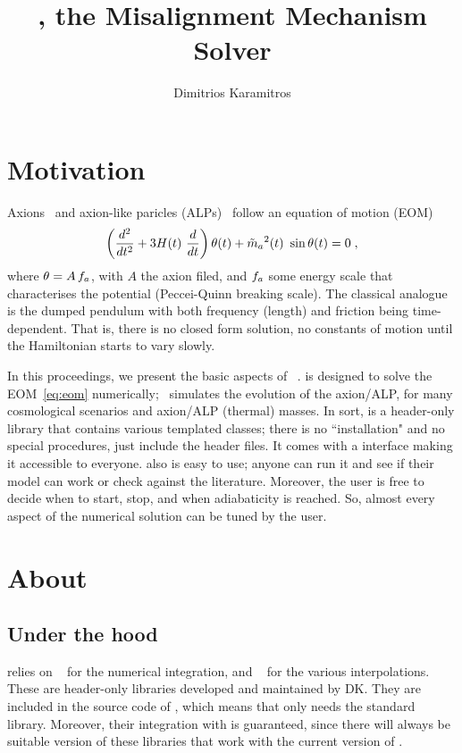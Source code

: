 \documentclass[a4paper,11pt]{article}
\title{\mimes, the Misalignment Mechanism Solver}
\author{Dimitrios Karamitros}
\affiliation{School of Physics and Astronomy, The University of Manchester,\\ Manchester M13 9PL,
	United Kingdom}
\begin{document}
\maketitle


\section{Motivation}
	Axions~\cite{Peccei:1977hh,Weinberg:1977ma,Wilczek:1977pj} and axion-like paricles (ALPs)~\cite{Chikashige:1980ui,Georgi:1981pu,Ringwald:2014vqa} follow an equation of motion (EOM)
	\begin{equation}
		\left( \dfrac{d^2}{d t^2} + 3 H(t) \ \dfrac{d}{d t}  \right) \theta(t) + \tilde m_{a}{}^2(t) \ \sin \theta(t) = 0 \; ,
		\label{eq:eom}
	\end{equation}	
	where $\theta= A \, f_{a}{}$, with $A$ the axion filed, and $f_{a}{}$ some energy scale that characterises the potential (Peccei-Quinn breaking scale).
	The classical analogue is the dumped pendulum with both frequency (length) and friction being time-dependent. That is, there is no closed form solution, 
	no constants of motion until the Hamiltonian starts to vary slowly. 
	
	
	In this proceedings, we present the basic aspects of \mimes~\cite{Karamitros:2021nxi}. \mimes is designed to solve the EOM~\ref{eq:eom} numerically; \ie~\mimes simulates the evolution of the axion/ALP, for many cosmological scenarios and axion/ALP (thermal) masses. In sort, \mimes is a \CPP header-only library that contains various templated classes; there is no ``installation" and no special procedures, just include the header files. It comes with a \PY interface making it accessible to everyone. \mimes also is easy to use; anyone can run it and see if their model can work or check against the literature. Moreover, the user is 
	free to decide when to start, stop, and when adiabaticity is reached. So, almost every aspect of the numerical solution can be tuned by the user.	

	

\section{About \mimes}
	\subsection{Under the hood}
	\mimes relies on ~\cite{NaBBODES} for the numerical integration, and ~\cite{SimpleSplines} for the various interpolations. 
	These are header-only libraries developed and maintained by DK. They are included in the source code of \mimes, which means that \mimes only needs the standard \CPP library.
	Moreover, their integration with \mimes is guaranteed, since there will always be suitable version of these libraries that work with the current version of   \mimes.
	
\end{document}
